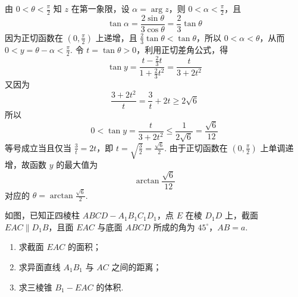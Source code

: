 \begin{solution}
由 \(0<\theta<\frac\pi2\) 知 \(z\) 在第一象限，设 \(\alpha=\arg z\)，则 \(0<\alpha<\frac\pi2\)，且
\[
\tan\alpha=\frac{2\sin\theta}{3\cos\theta}=\frac23\tan\theta
\]
因为正切函数在 \(\left(0,\frac\pi2\right)\) 上递增，且 \(\frac23\tan\theta<\tan\theta\)，所以 \(0<\alpha<\theta\)，从而 \(0<y=\theta-\alpha<\frac\pi2\). 令 \(t=\tan\theta>0\)，利用正切差角公式，得
\[
\tan y=\frac{t-\frac23t}{1+\frac23t^2}=\frac{t}{3+2t^2}
\]
又因为
\[
\frac{3+2t^2}{t}=\frac3t+2t\geqslant2\sqrt6
\]
所以
\[
0<\tan y=\frac{t}{3+2t^2}\leqslant\frac1{2\sqrt6}=\frac{\sqrt6}{12}
\]
等号成立当且仅当 \(\frac3t=2t\)，即 \(t=\sqrt{\frac32}=\frac{\sqrt6}{2}\). 由于正切函数在 \(\left(0,\frac\pi2\right)\) 上单调递增，故函数 \(y\) 的最大值为
\[
\arctan\frac{\sqrt6}{12}
\]
对应的 \(\theta=\arctan\frac{\sqrt6}{2}\).
\end{solution}

\begin{problem}
如图，已知正四棱柱 \(ABCD-A_1B_1C_1D_1\)，点 \(E\) 在棱 \(D_1D\) 上，截面 \(EAC\parallel D_1B\)，且面 \(EAC\) 与底面 \(ABCD\) 所成的角为 \(45^\circ\)，\(AB=a\).

\begin{enumerate}
\item 求截面 \(EAC\) 的面积；
\item 求异面直线 \(A_1B_1\) 与 \(AC\) 之间的距离；
\item 求三棱锥 \(B_1-EAC\) 的体积.
\end{enumerate}

\end{problem}

